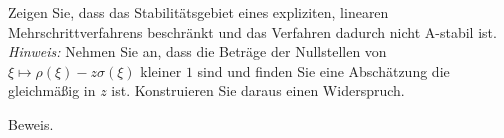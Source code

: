 \begin{exercise}
Zeigen Sie, dass das Stabilitätsgebiet eines expliziten, linearen Mehrschrittverfahrens
beschränkt und das Verfahren dadurch nicht A-stabil ist. \\
\textit{Hinweis:} Nehmen Sie an, dass die Beträge der Nullstellen von $\xi \mapsto \rho(\xi) - z\sigma(\xi)$
kleiner $1$ sind und finden Sie eine Abschätzung die gleichmäßig in $z$ ist.
Konstruieren Sie daraus einen Widerspruch.
\end{exercise}
\begin{solution}
Beweis.
\end{solution}

